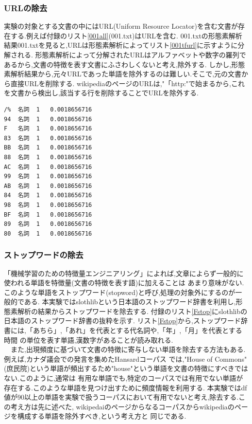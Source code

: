 \documentclass[a4j]{jarticle}
\begin{document}
\subsubsection{URLの除去}
実験の対象とする文書の中にはURL(Uniform Resource Locator)を含む文書が存在する.例えば付録のリスト\ref{001all}(001.txt)はURLを含む.
001.txtの形態素解析結果001.txtを見ると,URLは形態素解析によってリスト\ref{001tfurl}に示すように分解される.
形態素解析によって分解されたURLはアルファベットや数字の羅列であるから,文書の特徴を表す文書にふさわしくないと考え,除外する.
しかし,形態素解析結果から,元々URLであった単語を除外するのは難しい.そこで,元の文書から直接URLを削除する.
wikipediaのページのURLは,"「http:"で始まるから,これを文書から検出し,該当する行を削除することでURLを除外する.
\begin{lstlisting}[basicstyle=\ttfamily\footnotesize, frame=single,label=001tfurl,caption=URLの形態素解析結果の例]
/%	名詞	1	0.0018656716
94	名詞	1	0.0018656716
F	名詞	1	0.0018656716
83	名詞	1	0.0018656716
BB	名詞	1	0.0018656716
88	名詞	1	0.0018656716
AC	名詞	1	0.0018656716
99	名詞	1	0.0018656716
AB	名詞	1	0.0018656716
84	名詞	1	0.0018656716
98	名詞	1	0.0018656716
BF	名詞	1	0.0018656716
89	名詞	1	0.0018656716
80	名詞	1	0.0018656716
	\end{lstlisting}

\subsubsection{ストップワードの除去}
「機械学習のための特徴量エンジニアリング」\cite{engine}によれば,文章によらず一般的に使われる単語を特徴量(文書の特徴を表す語)に加えることは
あまり意味がない.このような単語をストップワード(stopword)と呼び,処理の対象外にするのが一般的である.
本実験ではslothlib\cite{slothlib}という日本語のストップワード辞書を利用し,形態素解析の結果からストップワードを除去する.
付録のリスト\ref{Fstop}にslothlibの日本語のストップワード辞書の抜粋を示す.
リスト\ref{Fstop}から,ストップワード辞書には,「あちら」,「あれ」を代表とする代名詞や,「年」,「月」を代表とする時間
の単位を表す単語,漢数字があることが読み取れる.\\
　また,出現頻度に基づいて文書の特徴に寄与しない単語を除去する方法もある.例えば,カナダ議会での発言を集めたHansardコーパス 
では,"House of Commons"(庶民院)という単語が頻出するため"house"という単語を文書の特徴にすべきではない.このように,通常は
有用な単語でも,特定のコーパスでは有用でない単語が存在する.このような単語を見つけ出すために頻度情報を利用する.
本実験ではdf値が90以上の単語を実験で扱うコーパスにおいて有用でないと考え,除去する.この考え方は先に述べた,
wikipedaiのページからなるコーパスからwikipediaのページを構成する単語を除外すべき,という考え方と
同じである.
\end{document}
